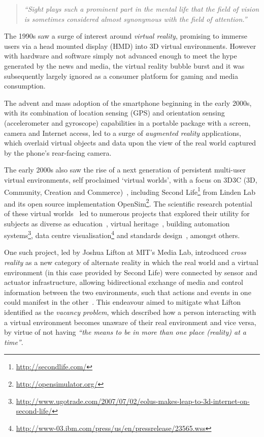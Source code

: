 \begin{quote}
	\textit{``Sight plays such a prominent part in the mental life that the field of vision is sometimes considered almost synonymous with the field of attention.''}~\cite{Lucas1951}
\end{quote}

The 1990s saw a surge of interest around \textit{virtual reality}, promising to immerse users via a head mounted display (HMD) into 3D virtual environments. However with hardware and software simply not advanced enough to meet the hype generated by the news and media, the virtual reality bubble burst and it was subsequently largely ignored as a consumer platform for gaming and media consumption.

The advent and mass adoption of the smartphone beginning in the early 2000s, with its combination of location sensing (GPS) and orientation sensing (accelerometer and gyroscope) capabilities in a portable package with a screen, camera and Internet access, led to a surge of \textit{augmented reality} applications, which overlaid virtual objects and data upon the view of the real world captured by the phone's rear-facing camera.

The early 2000s also saw the rise of a next generation of persistent multi-user virtual environments, self proclaimed `virtual worlds', with a focus on 3D3C (3D, Community, Creation and Commerce)~\cite{Sevan2008}, including Second Life\footnote{\url{http://secondlife.com/}} from Linden Lab and its open source implementation OpenSim\footnote{\url{http://opensimulator.org/}}. The scientific research potential of these virtual worlds~\cite{Bainbridge2007} led to numerous projects that explored their utility for subjects as diverse as education~\cite{Allison2012}, virtual heritage~\cite{Kennedy2013}, building automation systems\footnote{\url{http://www.ugotrade.com/2007/07/02/eolus-makes-leap-to-3d-internet-on-second-life/}}, data centre visualisation\footnote{\url{http://www-03.ibm.com/press/us/en/pressrelease/23565.wss}} and standards design~\cite{Gelissen2011a}, amongst others.

One such project, led by Joshua Lifton at MIT's Media Lab, introduced \textit{cross reality} as a new category of alternate reality in which the real world and a virtual environment (in this case provided by Second Life) were connected by sensor and actuator infrastructure, allowing bidirectional exchange of media and control information between the two environments, such that actions and events in one could manifest in the other~\cite{Lifton2007a}. This endeavour aimed to mitigate what Lifton identified as the \textit{vacancy problem}, which described how a person interacting with a virtual environment becomes unaware of their real environment and vice versa, by virtue of not having \textit{``the means to be in more than one place (reality) at a time''}.


